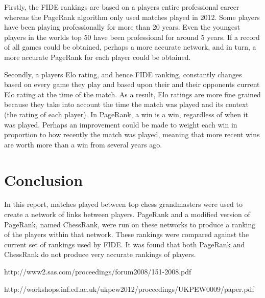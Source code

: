 \documentclass[pdftex,11pt,a4paper]{report}
\begin{document}
Firstly, the FIDE rankings are based on a players entire professional career whereas
the PageRank algorithm only used matches played in 2012. Some players have been
playing professionally for more than 20 years. Even the youngest players in the worlds top 50 have been
professional for around 5 years. If a record of all games could be obtained, perhaps a more accurate
network, and in turn, a more accurate PageRank for each player could be obtained.

Secondly, a players Elo rating, and hence FIDE ranking, constantly changes based on every game 
they play and based upon their and their opponents current Elo rating at the time of the match.
As a result, Elo ratings are more fine grained because they take into account the time
the match was played and its context (the rating of each player). In PageRank, a win
is a win, regardless of when it was played. Perhaps an improvement could be made to
weight each win in proportion to how recently the match was played, meaning that
more recent wins are worth more than a win from several years ago.

\chapter{Conclusion}

In this report, matches played between top chess grandmasters were used to create
a network of links between players. PageRank and a modified version of PageRank, named ChessRank,
were run on these networks to produce a ranking of the players within that network. These
rankings were compared against the current set of rankings used by FIDE. It was found that both
PageRank and ChessRank do not produce very accurate rankings of players.













\clearpage{}


\begin{thebibliography}{9}

http://www2.sas.com/proceedings/forum2008/151-2008.pdf

http://workshops.inf.ed.ac.uk/ukpew2012/proceedings/UKPEW0009/paper.pdf




\end{thebibliography}
\end{document}
